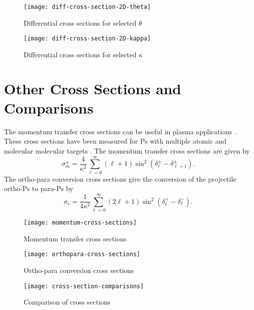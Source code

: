 \documentclass[Dissertation.tex]{subfiles}
\begin{document}
\begin{figure}[H]
	\centering
	\texttt{[image: diff-cross-section-2D-theta]}
	\caption{Differential cross sections for selected $\theta$}
	\label{fig:diff-cross-section-2D-theta}
\end{figure}

\begin{figure}[H]
	\centering
	\texttt{[image: diff-cross-section-2D-kappa]}
	\caption{Differential cross sections for selected $\kappa$}
	\label{fig:diff-cross-section-2D-kappa}
\end{figure}


\section{Other Cross Sections and Comparisons}
\label{sec:OtherCross}

The momentum transfer cross sections can be useful in plasma applications \cite{Wang2014, McEachran2014}. These cross sections have been measured for Ps with multiple atomic and molecular molecular targets \cite{Nagashima1998,Saito2003}. The momentum transfer cross sections are given by \cite{Bransden2003}
\begin{equation}
\label{eq:MomentumCross}
\sigma_{m}^\pm = \frac{4}{\kappa^2} \sum_{\ell=0}^\infty (\ell+1) \sin^2 (\delta_\ell^\pm - \delta_{\ell+1}^\pm) .
\end{equation}
The ortho-para conversion cross sections give the conversion of the projectile ortho-Ps to para-Ps by \cite{Hara1975}
\begin{equation}
\label{eq:OrthoParaCross}
\sigma_{c} = \frac{1}{4 \kappa^2} \sum_{\ell=0}^\infty (2 \ell+1) \sin^2 (\delta_\ell^+ - \delta_\ell^-).
\end{equation}

\begin{figure}[H]
	\centering
	\texttt{[image: momentum-cross-sections]}
	\caption{Momentum transfer cross sections}
	\label{fig:momentum-cross-sections}
\end{figure}

\begin{figure}[H]
	\centering
	\texttt{[image: orthopara-cross-sections]}
	\caption{Ortho-para conversion cross sections}
	\label{fig:orthopara-cross-sections}
\end{figure}

\begin{figure}[H]
	\centering
	\texttt{[image: cross-section-comparisons]}
	\caption{Comparison of cross sections}
	\label{fig:cross-section-comparisons}
\end{figure}





\biblio
\end{document}
